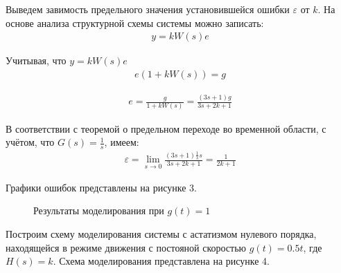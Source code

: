 \documentclass[a4paper, 11pt]{article}
\begin{document}
\newpage
\par 
Выведем завимость предельного значения установившейся ошибки $\varepsilon$ от $k$. На основе анализа структурной схемы системы можно записать:
\begin{align}
\displaystyle y=kW(s)e
\end{align}

\par 
Учитывая, что $y=kW(s)e$
\begin{align}
\displaystyle e(1+kW(s))=g
\end{align} 

\begin{align}
e=\displaystyle \frac{g}{1+kW(s)}=\frac{(3s+1)g}{3s+2k+1}
\end{align} 

\par 
В соответствии с теоремой о предельном переходе во временной области, с учётом, что $G(s)=\displaystyle \frac{1}{s}$, имеем:
\begin{align}
\varepsilon=\lim_{s\to 0}\displaystyle \frac{(3s+1)\frac{1}{s}s}{3s+2k+1}=\frac{1}{2k+1}
\end{align} 

\par 
Графики ошибок представлены на рисунке 3. 

\begin{figure}[h!]
\centering
{}
\caption{Результаты моделирования при $g(t)=1$}
\end{figure}

\par 
Построим схему моделирования системы с астатизмом нулевого порядка, находящейся в режиме движения с постояной скоростью $g(t)=0.5t$, где $H(s)=k$. Схема моделирования представлена на рисунке 4.
\end{document}
